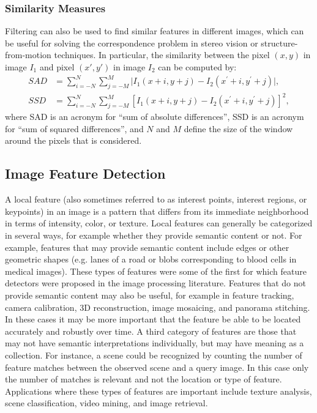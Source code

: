 \subsubsection{Similarity Measures}
Filtering can also be used to find similar features in different images, which can be useful for solving the correspondence problem in stereo vision or structure-from-motion techniques. 
In particular, the similarity between the pixel $(x,y)$ in image $I_1$ and pixel $(x', y')$ in image $I_2$ can be computed by:
\begin{equation} \label{eq:similarity}
\begin{split}
SAD &= \sum_{i=-N}^N \sum_{j=-M}^M \rvert I_1(x+i,y+j)-I_2(x^\prime+i,y^\prime+j)\lvert, \\
SSD &= \sum_{i=-N}^N \sum_{j=-M}^M [I_1(x+i,y+j)-I_2(x^\prime+i,y^\prime+j)]^2,
\end{split}
\end{equation}
where SAD is an acronym for ``sum of absolute differences'', SSD is an acronym for ``sum of squared differences'', and $N$ and $M$ define the size of the window around the pixels that is considered.

\subsection{Image Feature Detection}
A local feature (also sometimes referred to as interest points, interest regions, or keypoints) in an image is a pattern that differs from its immediate neighborhood in terms of intensity, color, or texture. 
Local features can generally be categorized in several ways, for example whether they provide semantic content or not. For example, features that may provide semantic content include edges or other geometric shapes (e.g. lanes of a road or blobs corresponding to blood cells in medical images). These types of features were some of the first for which feature detectors were proposed in the image processing literature. Features that do not provide semantic content may also be useful, for example in feature tracking, camera calibration, 3D reconstruction, image mosaicing, and panorama stitching. In these cases it may be more important that the feature be able to be located accurately and robustly over time. A third category of features are those that may not have semantic interpretations individually, but may have meaning as a collection.
For instance, a scene could be recognized by counting the number of feature matches between the observed scene and a query image. In this case only the number of matches is relevant and not the location or type of feature. Applications where these types of features are important include texture analysis, scene classification, video mining, and
image retrieval.

